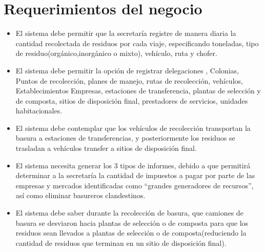\section{Requerimientos del negocio}
\begin{itemize}
		\item El sistema debe permitir que la secretaría registre de manera diaria  la cantidad recolectada de residuos por cada viaje, especificando toneladas, tipo de residuo(orgánico,inorgánico o mixto), vehículo, ruta y chofer.
		\item El sistema debe permitir la opción de registrar delegaciones , Colonias, Puntos de recolección, planes de manejo, rutas de recolección, vehículos, Establecimientos Empresas, estaciones de transferencia, plantas de selección y de composta, sitios de disposición final, prestadores de servicios, unidades habitacionales.
		\item El sistema debe contemplar que los vehículos de recolección transportan la basura a estaciones de transferencias, y posteriormente los residuos se trasladan a vehículos transfer a sitios de disposición final.
		\item El sistema necesita generar los 3 tipos de informes, debido a que permitirá determinar a la secretaría la cantidad de impuestos a pagar por parte de las empresas y mercados identificadas como “grandes generadores de recursos”, así como eliminar basureros clandestinos.
		\item El sistema debe saber durante la recolección de basura, que camiones de basura se desviaron hacia plantas de selección o de composta para que los residuos sean llevados a plantas de selección o de  composta(reduciendo la cantidad de residuos que terminan en un sitio de disposición final). 
	
\end{itemize}
